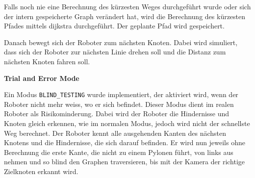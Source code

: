 Falls noch nie eine Berechnung des kürzesten Weges durchgeführt wurde oder sich der intern gespeicherte Graph verändert hat, wird die Berechnung des kürzesten Pfades mittels \gls{dijkstra} durchgeführt. Der geplante Pfad wird gespeichert.

Danach bewegt sich der Roboter zum nächsten Knoten. Dabei wird simuliert, dass sich der Roboter zur nächsten Linie drehen soll und die Distanz zum nächsten Knoten fahren soll.







\textbf{Trial and Error Mode}

Ein Modus \verb|BLIND_TESTING| wurde implementiert, der aktiviert wird, wenn der Roboter nicht mehr weiss, wo er sich befindet. Dieser Modus dient im realen Roboter als Risikominderung. Dabei wird der Roboter die Hindernisse und Knoten gleich erkennen, wie im normalen Modus, jedoch wird nicht der schnellste Weg berechnet. Der Roboter kennt alle ausgehenden Kanten des nächsten Knotens und die Hindernisse, die sich darauf befinden. Er wird nun jeweils ohne Berechnung die erste Kante, die nicht zu einem Pylonen führt, von links aus nehmen und so blind den Graphen traversieren, bis mit der Kamera der richtige Zielknoten erkannt wird.


